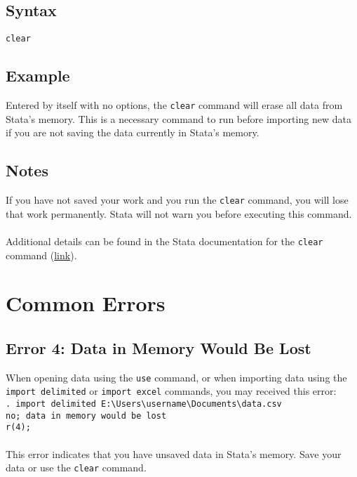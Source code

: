 \documentclass[letterpaper,11pt]{article}
\begin{document}
\subsection{Syntax}
\texttt{{\color{Red}clear}}\\

\subsection{Example}
Entered by itself with no options, the \texttt{{\color{Red}clear}} command will erase all data from Stata's memory. This is a necessary command to run before importing new data if you are not saving the data currently in Stata's memory.  \\

\subsection{Notes}
If you have not saved your work and you run the \texttt{{\color{Red}clear}} command, you will lose that work permanently. Stata will not warn you before executing this command. \\
\\
Additional details can be found in the Stata documentation for the \texttt{{\color{Red}clear}} command (\href{http://www.stata.com/manuals14/dclear.pdf}{link}).\\
\newpage
\section{Common Errors}
\subsection{Error 4: Data in Memory Would Be Lost}
When opening data using the \texttt{{\color{Red}use}} command, or when importing data using the \texttt{{\color{Red}import delimited}} or \texttt{{\color{Red}import excel}} commands, you may received this error: \\
\texttt{. import delimited E:\textbackslash{}Users\textbackslash{}username\textbackslash{}Documents\textbackslash{}data.csv}\\
\texttt{{\color{Red}no; data in memory would be lost}}\\
\texttt{{\color{Blue}r(4);}}\\
\\
This error indicates that you have unsaved data in Stata's memory. Save your data or use the \texttt{{\color{Red}clear}} command.\\
\end{document}
